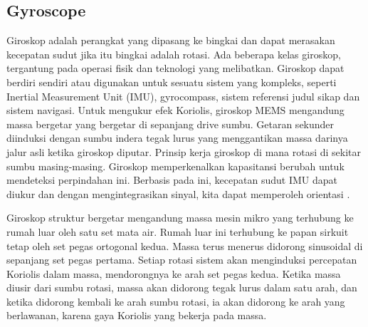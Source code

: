 \subsection{Gyroscope}

Giroskop adalah perangkat yang dipasang ke bingkai dan dapat merasakan kecepatan sudut jika itu bingkai adalah rotasi. Ada beberapa kelas giroskop, tergantung pada operasi fisik dan 
teknologi yang melibatkan. Giroskop dapat berdiri sendiri atau digunakan untuk sesuatu sistem yang kompleks, seperti Inertial Measurement Unit (IMU), gyrocompass, sistem referensi judul 
sikap dan sistem navigasi. Untuk mengukur efek Koriolis, giroskop MEMS mengandung massa bergetar yang bergetar di sepanjang drive sumbu. Getaran sekunder diinduksi 
dengan sumbu indera tegak lurus yang menggantikan massa darinya jalur asli ketika giroskop diputar. Prinsip kerja giroskop di mana rotasi di sekitar sumbu masing-masing. 
Giroskop memperkenalkan kapasitansi berubah untuk mendeteksi perpindahan ini. Berbasis pada ini, kecepatan sudut IMU dapat diukur dan dengan mengintegrasikan sinyal, kita dapat memperoleh
orientasi \parencite{Passaro2017}.

Giroskop struktur bergetar mengandung massa mesin mikro yang terhubung ke rumah luar oleh satu set mata air. Rumah luar ini terhubung ke papan sirkuit tetap oleh set pegas ortogonal 
kedua. Massa terus menerus didorong sinusoidal di sepanjang set pegas pertama. Setiap rotasi sistem akan menginduksi percepatan Koriolis dalam massa, mendorongnya ke arah set pegas 
kedua. Ketika massa diusir dari sumbu rotasi, massa akan didorong tegak lurus dalam satu arah, dan ketika didorong kembali ke arah sumbu rotasi, ia akan didorong ke arah yang 
berlawanan, karena gaya Koriolis yang bekerja pada massa.

